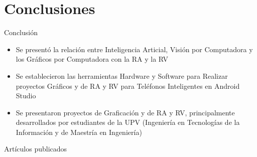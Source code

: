 \documentclass[aspectratio=169,compress]{beamer}
\begin{document}
\section[CP1]{Conclusiones}
\begin{frame}{Conclusi\'on}
\begin{itemize}
\item Se present\'o la relaci\'on entre Inteligencia Articial, Visi\'on por Computadora y los Gr\'aficos por Computadora con la RA y la RV
\item Se establecieron las herramientas Hardware y Software para Realizar proyectos Gr\'aficos y de RA y RV para Tel\'efonos Inteligentes en Android Studio
\item Se presentaron proyectos de Graficaci\'on y de RA y RV, principalmente desarrollados por estudiantes de la UPV (Ingenier\'ia en Tecnolog\'ias de la Informaci\'on y de Maestría en Ingeniería)
\end{itemize}
\end{frame}





\renewcommand*{\bibfont}{\tiny}
\begin{frame}[allowframebreaks]{Artículos publicados}
    \printbibliography[title=Artículos publicados,keyword=primary]
\end{frame}
\end{document}
